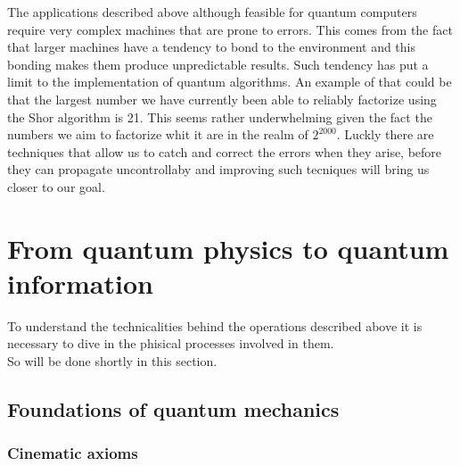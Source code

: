 \documentclass{article}
\begin{document}
\vspace{10pt}

The applications described above although feasible for quantum computers require
very complex machines that are prone to errors.
This comes from the fact that larger machines have a tendency to bond to the
environment and this bonding makes them produce unpredictable results.
Such tendency has put a limit to the implementation of quantum algorithms.
An example of that could be that the largest number we have currently been
able to reliably factorize using the Shor algorithm is 21.
This seems rather underwhelming given the fact the numbers we aim to factorize
whit it are in the realm of $2^{2000}$.
Luckly there are techniques that allow us to catch and correct the errors
when they arise, before they can propagate uncontrollaby and improving
such tecniques will bring us closer to our goal.



\section{From quantum physics to quantum information}

To understand the technicalities behind the operations described above it is
necessary to dive in the phisical processes involved in them.\\
So will be done shortly in this section.

\newpage

\subsection{Foundations of quantum mechanics}

\subsubsection{Cinematic axioms}
\end{document}
